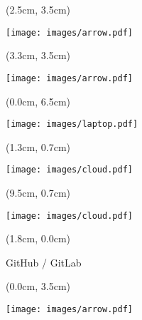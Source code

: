 \documentclass[aspectratio=169]{beamer}
\begin{document}
\begin{frame}{}
  \begin{textblock*}{5cm}(2.5cm, 3.5cm)
    \begin{center}
      \texttt{[image: images/arrow.pdf]}
    \end{center}
  \end{textblock*}

  \begin{textblock*}{5cm}(3.3cm, 3.5cm)
    \begin{center}
      \texttt{[image: images/arrow.pdf]}
    \end{center}
  \end{textblock*}      
  
\end{frame}




\begin{frame}{}

  \begin{textblock*}{5cm}(0.0cm, 6.5cm)
    \begin{center}
      \texttt{[image: images/laptop.pdf]}
    \end{center}
  \end{textblock*}

  \begin{textblock*}{5cm}(1.3cm, 0.7cm)
    \begin{center}
      \texttt{[image: images/cloud.pdf]}
    \end{center}
  \end{textblock*}
  
  \begin{textblock*}{5cm}(9.5cm, 0.7cm)
    \begin{center}
      \texttt{[image: images/cloud.pdf]}
    \end{center}
  \end{textblock*}
  
  \begin{textblock*}{5cm}(1.8cm, 0.0cm)
    \begin{center}
      {\small GitHub / GitLab}
    \end{center}
  \end{textblock*}  

  \begin{textblock*}{5cm}(0.0cm, 3.5cm)
    \begin{center}
      \texttt{[image: images/arrow.pdf]}
    \end{center}
  \end{textblock*}


\end{frame}
\end{document}
